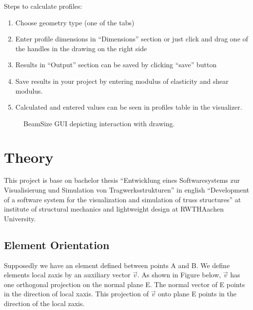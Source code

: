 \documentclass[letterpaper,10pt,english]{sphinxmanual}
\begin{document}
Steps to calculate profiles:
\begin{enumerate}
%
\item {} 
Choose geometry type (one of the tabs)

\item {} 
Enter profile dimensions in “Dimensions” section or just click and drag one of the handles in the drawing on the right side

\item {} 
Results in “Output” section can be saved by clicking “save” button

\item {} 
Save results in your project by entering modulus of elasticity and shear modulus.

\item {} 
Calculated and entered values can be seen in profiles table in the visualizer.

\end{enumerate}

\begin{figure}[htbp]
\centering
\capstart

\noindent{}
\caption{BeamSize GUI depicting interaction with drawing.}\label{\detokenize{making_a_model:id28}}\end{figure}


\section{Theory}
\label{\detokenize{theory:theory}}\label{\detokenize{theory::doc}}
This project is base on bachelor thesis “Entwicklung eines Softwaresystems zur Visualisierung und Simulation von
Tragwerksstrukturen” in english “Development of a software system for the visualization and simulation of truss
structures” at institute of structural mechanics and lightweight design at RWTH\sphinxhyphen{}Aachen University.


\subsection{Element Orientation}
\label{\detokenize{theory:element-orientation}}
Supposedly we have an element defined between points A and B.
We define elements local z\sphinxhyphen{}axis by an auxiliary vector \(\vec{v}\). As shown in Figure below, \(\vec{v}\) has one
orthogonal projection on the normal plane E. The normal vector of E points in the direction
of local x\sphinxhyphen{}axis. This projection of \(\vec{v}\) onto plane E points in the direction of the local z\sphinxhyphen{}axis.
\end{document}
